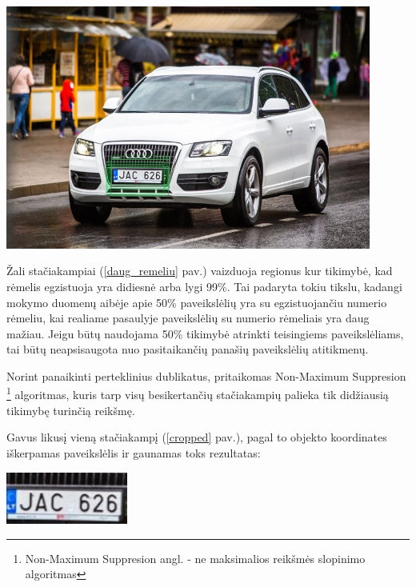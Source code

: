 \documentclass{VUMIFInfBakalaurinis}
\begin{document}
\begin{minipage}{\linewidth}
  \centering
  \includegraphics[width=12cm]{sliding.jpg}
  \label{daug_remeliu}
\end{minipage}

Žali stačiakampiai (\ref{daug_remeliu} pav.) vaizduoja regionus kur tikimybė, kad rėmelis egzistuoja yra didiesnė arba lygi 99\%.
Tai padaryta tokiu tikslu, kadangi mokymo duomenų aibėje apie 50\% paveikslėlių yra su egzistuojančiu numerio rėmeliu,
kai realiame pasaulyje paveikslėlių su numerio rėmeliais yra daug mažiau. Jeigu būtų naudojama 50\% tikimybė atrinkti 
teisingiems paveikslėliams, tai būtų neapsisaugota nuo pasitaikančių panašių paveikslėlių atitikmenų.

Norint panaikinti perteklinius dublikatus, pritaikomas 
Non-Maximum Suppresion \footnote{Non-Maximum Suppresion angl. - ne maksimalios reikšmės slopinimo algoritmas} algoritmas, kuris
tarp visų besikertančių stačiakampių palieka tik didžiausią tikimybę turinčią reikšmę\cite{girshick2014rich}.

Gavus likusį vieną stačiakampį (\ref{cropped} pav.), pagal to objekto koordinates iškerpamas paveikslėlis ir gaunamas toks rezultatas:

\begin{minipage}{\linewidth}
  \centering
  \includegraphics[width=4cm]{cropped_4.jpg}
  \label{cropped}
\end{minipage}
\end{document}
